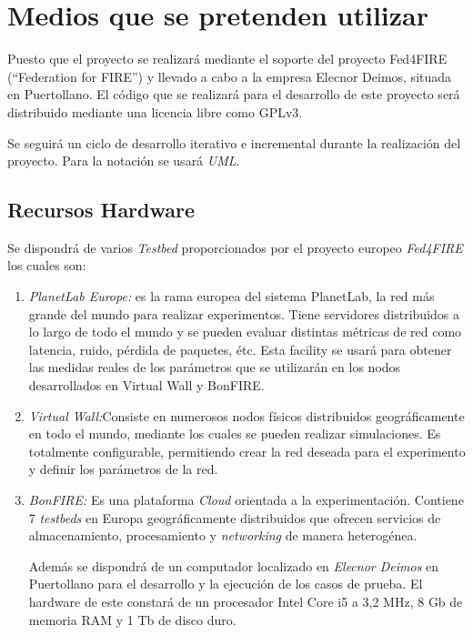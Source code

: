 
\section{Medios que se pretenden utilizar}
\label{sec:medios}

Puesto que el proyecto se realizará mediante el soporte del proyecto Fed4FIRE (``Federation for FIRE'') y llevado a cabo a la empresa Elecnor Deimos, situada en Puertollano. El código que se realizará para el desarrollo de este proyecto será distribuido mediante una licencia libre como GPLv3\cite{GPLv3}.

Se seguirá un ciclo de desarrollo iterativo e incremental durante la realización del proyecto.
Para la notación se usará \emph{UML}\cite{UML}.

\subsection{Recursos Hardware}
\label{sec:hardware}
Se dispondrá de varios \emph{Testbed} proporcionados por el proyecto europeo \emph{Fed4FIRE} los cuales son:
\begin{enumerate}
\item \emph{PlanetLab Europe\cite{PLE}:} es la rama europea del sistema PlanetLab, la red más grande del mundo para realizar experimentos. Tiene servidores distribuidos a lo largo de todo el mundo y se pueden evaluar distintas métricas de red como latencia, ruido, pérdida de paquetes, étc. Esta facility se usará para obtener las medidas reales de los parámetros que se utilizarán en los nodos desarrollados en Virtual Wall y BonFIRE.

\item \emph{Virtual Wall\cite{VW}:}Consiste en numerosos nodos físicos distribuidos geográficamente en todo el mundo, mediante los cuales se pueden realizar simulaciones. Es totalmente configurable, permitiendo crear la red deseada para el experimento y definir los parámetros de la red.
\item \emph{BonFIRE\cite{BF}:} Es una plataforma \emph{Cloud} orientada a la experimentación. Contiene 7 \emph{testbeds} en Europa geográficamente distribuidos que ofrecen servicios de almacenamiento, procesamiento y \emph{networking} de manera heterogénea.

Además se dispondrá de un computador localizado en \emph{Elecnor Deimos} en Puertollano para el desarrollo y la ejecución de los casos de prueba. El hardware de este constará de un procesador Intel Core i5 a 3,2 MHz, 8 Gb de memoria RAM y 1 Tb de disco duro.

\end{enumerate}

